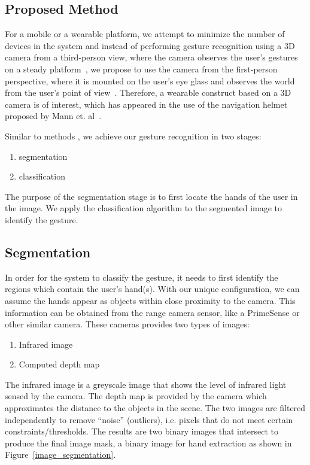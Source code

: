 \subsection{Proposed Method}
For a mobile or a wearable platform, we attempt to minimize the number of
devices in the system and instead of performing gesture recognition
using a 3D camera from a third-person view, where the camera observes the
user's gestures on a steady platform~\cite{li2009real}, we propose to use
the camera from the first-person perspective, where it is mounted on the
user's eye glass and observes the world from the user's point of
view~\cite{mann2011blind}. Therefore, a wearable construct based on
a 3D camera is of interest, which has appeared in the use of the navigation
helmet proposed by Mann et. al~\cite{mann2011blind}.

Similar to methods \cite{li2009real, kjeldsen1996toward, ren2011robust, uebersax2011real},
we achieve our gesture recognition in two stages:
\begin{enumerate}
\item segmentation
\item classification
\end{enumerate}

The purpose of the segmentation stage is to first locate the hands of the user in the image. We apply the classification algorithm to the segmented image to identify the gesture.

\subsection{Segmentation}
In order for the system to classify the gesture, it needs to first identify the regions which contain the user's hand(s). With our unique configuration,
we can assume the hands appear as objects within close proximity to the camera.
This information can be obtained from the range camera sensor,
like a PrimeSense or other similar camera. These cameras provides two
types of images:
\begin{enumerate}
\item Infrared image
\item Computed depth map
\end{enumerate}
The infrared image is a greyscale image that shows the level of infrared
light sensed by the camera. The depth map is provided by the camera which
approximates the distance to the objects in the scene. The two images are
filtered independently to remove ``noise'' (outliers),
i.e. pixels that do not meet certain
constraints/thresholds. The results are two binary images that intersect
to produce the final image mask, a binary image for hand extraction as
shown in Figure~\ref{image_segmentation}.

